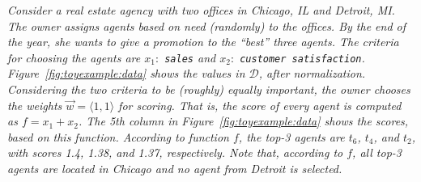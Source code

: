 \begin{example}\label{example1}
\em
Consider a real estate agency with two offices in Chicago, IL and Detroit, MI.
The owner assigns agents based on need (randomly) to the offices.
By the end of the year, she wants to give a promotion to the ``best'' three agents.
The criteria for choosing the agents are $x_1:$ {\tt \small sales} and $x_2:$ {\tt \small customer satisfaction}.
Figure~\ref{fig:toyexample:data} shows the values in $\mathcal{D}$, after normalization.
Considering the two criteria to be (roughly) equally important, the owner chooses the weights $\vec{w}=\langle 1, 1 \rangle$ for scoring. That is, the score of every agent is computed as $f=x_1+x_2$.
The 5th column in Figure~\ref{fig:toyexample:data} shows the scores, based on this function.
According to function $f$, the top-3 agents are $t_6$, $t_4$, and $t_2$, with scores 1.4, 1.38, and 1.37, respectively. 
Note that, according to $f$, all top-3 agents are located in Chicago and no agent from Detroit is selected.
\end{example}

